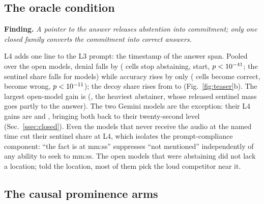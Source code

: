 \documentclass{article}
\newcommand{\finding}[1]{\par\smallskip\noindent\textbf{Finding.} \emph{#1}\par\smallskip}
\begin{document}
\subsection{The oracle condition}
\label{ssec:oracle}
\finding{A pointer to the answer releases abstention into commitment; only
one closed family converts the commitment into correct answers.}
L4 adds one line to the L3 prompt: the timestamp of the answer span. Pooled
over the open models, denial falls by \oracleDenialDrop{}
(\pairAbsentOracleDown{} cells stop abstaining, \pairAbsentOracleUp{} start,
$p<10^{-41}{}$; the sentinel share falls for \signOracleAbsDown{}
models) while accuracy rises by only \oracleGain{} (\pairCorrectOracleUp{}
cells become correct, \pairCorrectOracleDown{} become wrong,
$p<10^{-11}{}$); the decoy share rises from
\roleSalienceLThree{} to \roleSalienceLFour{} (Fig.~\ref{fig:teaser}b). The
largest open-model gain is \openMaxOracleGain{} (\openMaxOracleName{}, the
heaviest abstainer, whose released sentinel mass goes partly to the answer).
The two Gemini models are the exception: their L4 gains are
\closedgeminiflashOracleGain{} and \closedgeminiliteOracleGain{}, bringing
both back to their twenty-second level (Sec.~\ref{ssec:closed}). Even the
\Ntrunc{} models that never receive the audio at the named time cut their
sentinel share at L4, which isolates the prompt-compliance component: ``the
fact is at mm:ss'' suppresses ``not mentioned'' independently of any ability
to seek to mm:ss. The open models that were abstaining did not lack a
location; told the location, most of them pick the loud competitor near
it.

\subsection{The causal prominence arms}
\label{ssec:causal}
\end{document}
